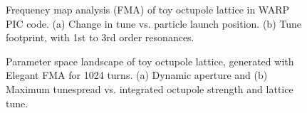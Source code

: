 \begin{figure}[]
\centering
{}
\hspace{.5in}
\caption{Frequency map analysis (FMA) of toy octupole lattice in WARP PIC code. (a) Change in tune vs. particle launch position. (b) Tune footprint, with 1st to 3rd order resonances.}
\label{fig:toy-fma}
\end{figure}

\begin{figure}[]
\centering
{}\hspace{.25in}
\caption{Parameter space landscape of toy octupole lattice, generated with Elegant FMA for 1024 turns. (a) Dynamic aperture and (b) Maximum tunespread vs. integrated octupole strength and lattice tune.}
\label{fig:fma-op}
\end{figure}



